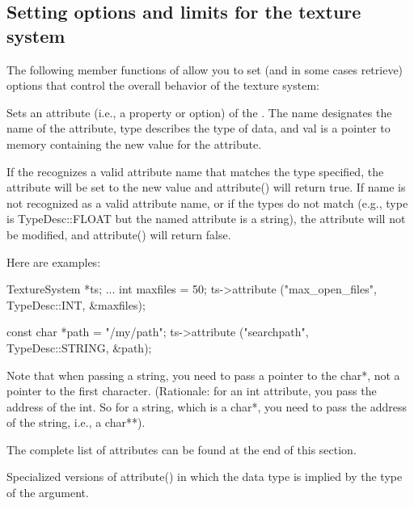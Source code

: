 \subsection{Setting options and limits for the texture system}
\label{sec:texturesys:api:options}

The following member functions of \TextureSystem allow you to set
(and in some cases retrieve) options that control the overall
behavior of the texture system:


Sets an attribute (i.e., a property or option) of the \TextureSystem.
The {\cf name} designates the name of the attribute, {\cf type}
describes the type of data, and {\cf val} is a pointer to memory 
containing the new value for the attribute.

If the \TextureSystem recognizes a valid attribute name that matches the
type specified, the attribute will be set to the new value and {\cf
  attribute()} will return {\cf true}.  If {\cf name} is not recognized
as a valid attribute name, or if the types do not match (e.g., {\cf
  type} is {\cf TypeDesc::FLOAT} but the named attribute is a string),
the attribute will not be modified, and {\cf attribute()} will return
{\cf false}.

Here are examples:

\begin{code}
      TextureSystem *ts; 
      ...
      int maxfiles = 50;
      ts->attribute ("max_open_files", TypeDesc::INT, &maxfiles);

      const char *path = "/my/path";
      ts->attribute ("searchpath", TypeDesc::STRING, &path);
\end{code}

Note that when passing a string, you need to pass a pointer to the {\cf
  char*}, not a pointer to the first character.  (Rationale: for an {\cf
  int} attribute, you pass the address of the {\cf int}.  So for a
string, which is a {\cf char*}, you need to pass the address of the
string, i.e., a {\cf char**}).

The complete list of attributes can be found at the end of this section.

\apiend

Specialized versions of {\cf attribute()} in which the data type is
implied by the type of the argument.

